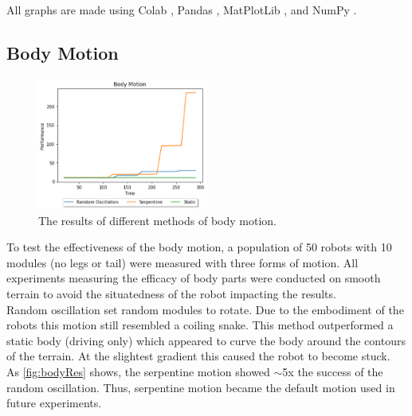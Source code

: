 \documentclass{article}
\begin{document}
All graphs are made using Colab \citep{colab}, Pandas \citep{pd}, MatPlotLib \citep{plt}, and NumPy \citep{np}.

\subsection{Body Motion}
\label{sec:Body Res}
\begin{figure}
    \centering
    \includegraphics[width=0.5\textwidth]{bodyResults}
    \caption{The results of different methods of body motion.}
    \label{fig:bodyRes}
\end{figure}
To test the effectiveness of the body motion, a population of 50 robots with 10 modules (no legs or tail) were measured with three forms of motion. All experiments measuring the efficacy of body parts were conducted on smooth terrain to avoid the situatedness of the robot impacting the results.\\
Random oscillation set random modules to rotate. Due to the embodiment of the robots this motion still resembled a coiling snake. This method outperformed a static body (driving only) which appeared to curve the body around the contours of the terrain. At the slightest gradient this caused the robot to become stuck. \\
As \autoref{fig:bodyRes} shows, the serpentine motion showed $\sim$5x the success of the random oscillation. Thus, serpentine motion became the default motion used in future experiments. 
\end{document}
